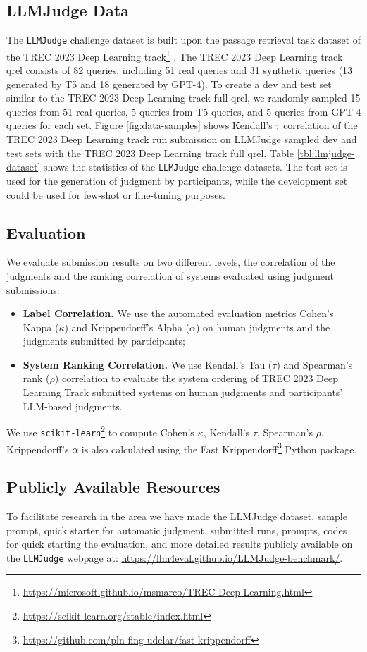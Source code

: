 \subsection{LLMJudge Data}
The \texttt{LLMJudge} challenge dataset is built upon the passage retrieval task dataset of the TREC 2023 Deep Learning track\footnote{\url{https://microsoft.github.io/msmarco/TREC-Deep-Learning.html}} \cite{craswell2024overview}. The TREC 2023 Deep Learning track qrel consists of 82 queries, including 51 real queries and 31 synthetic queries (13 generated by T5 and 18 generated by GPT-4). To create a dev and test set similar to the TREC 2023 Deep Learning track full qrel, we randomly sampled 15 queries from 51 real queries, 5 queries from T5 queries, and 5 queries from GPT-4 queries for each set. Figure \ref{fig:data-samples} shows Kendall's $\tau$ correlation of the TREC 2023 Deep Learning track run submission on LLMJudge sampled dev and test sets with the TREC 2023 Deep Learning track full qrel. Table \ref{tbl:llmjudge-dataset} shows the statistics of the \texttt{LLMJudge} challenge datasets. The test set is used for the generation of judgment by participants, while the development set could be used for few-shot or fine-tuning purposes.



\subsection{Evaluation}
We evaluate submission results on two different levels, the correlation of the judgments and the ranking correlation of systems evaluated using judgment submissions:

\begin{itemize}
    \item \textbf{Label Correlation.} We use the automated evaluation metrics Cohen's Kappa ($\kappa$) and Krippendorff's Alpha ($\alpha$) on human judgments and the judgments submitted by participants;
    \item \textbf{System Ranking Correlation.} We use Kendall's Tau ($\tau$) and Spearman's rank ($\rho$) correlation to evaluate the system ordering of TREC 2023 Deep Learning Track \cite{craswell2024overview} submitted systems on human judgments and participants' LLM-based judgments.
\end{itemize}

We use \texttt{scikit-learn}\footnote{\url{https://scikit-learn.org/stable/index.html}} to compute Cohen's $\kappa$, Kendall's $\tau$, Spearman's $\rho$. Krippendorff's $\alpha$ is also calculated using the Fast Krippendorff\footnote{\url{https://github.com/pln-fing-udelar/fast-krippendorff}} Python package. 

\subsection{Publicly Available Resources}
To facilitate research in the area we have made the LLMJudge dataset, sample prompt, quick starter for automatic judgment, submitted runs, prompts, codes for quick starting the evaluation, and more detailed results publicly available on the \texttt{LLMJudge} webpage at: \url{https://llm4eval.github.io/LLMJudge-benchmark/}.